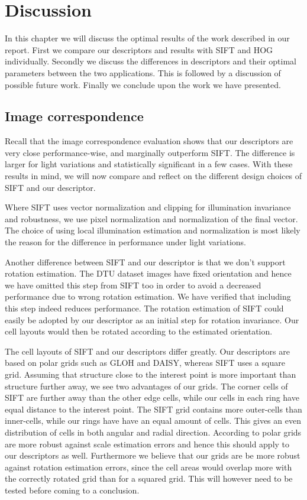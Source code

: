 \documentclass[thesis.tex]{subfiles}
\begin{document}
\chapter{Discussion}

In this chapter we will discuss the optimal results of the work described in our report.
First we compare our descriptors and results with SIFT and HOG individually. Secondly we discuss the differences in descriptors and their optimal parameters between the two applications.
This is followed by a discussion of possible future work. Finally we conclude upon the work we have presented.

\section{Image correspondence}
\label{sec:discussionIc}
Recall that the image correspondence evaluation shows that our descriptors are very close performance-wise, and marginally outperform SIFT. The difference is larger for light variations and statistically significant in a few cases. With these results in mind, we will now compare and reflect on the different design choices of SIFT and our descriptor.

Where SIFT uses vector normalization and clipping for illumination invariance and robustness, we use pixel normalization and normalization of the final vector. The choice of using local illumination estimation and normalization is most likely the reason for the difference in performance under light variations.

Another difference between SIFT and our descriptor is that we don't support rotation estimation. The DTU dataset images have fixed orientation and hence we have omitted this step from SIFT too in order to avoid a decreased performance due to wrong rotation estimation. We have verified that including this step indeed reduces performance. The rotation estimation of SIFT could easily be adopted by our descriptor as an initial step for rotation invariance. Our cell layouts would then be rotated according to the estimated orientation.

The cell layouts of SIFT and our descriptors differ greatly. Our descriptors are based on polar grids such as GLOH and DAISY, whereas SIFT uses a square grid. Assuming that structure close to the interest point is more important than structure further away, we see two advantages of our grids. The corner cells of SIFT are further away than the other edge cells, while our cells in each ring have equal distance to the interest point. The SIFT grid contains more outer-cells than inner-cells, while our rings have have an equal amount of cells. This gives an even distribution of cells in both angular and radial direction. According to \citet{cui2009scale} polar grids are more robust against scale estimation errors and hence this should apply to our descriptors as well. Furthermore we believe that our grids are be more robust against rotation estimation errors, since the cell areas would overlap more with the correctly rotated grid than for a squared grid. This will however need to be tested before coming to a conclusion.
\end{document}
